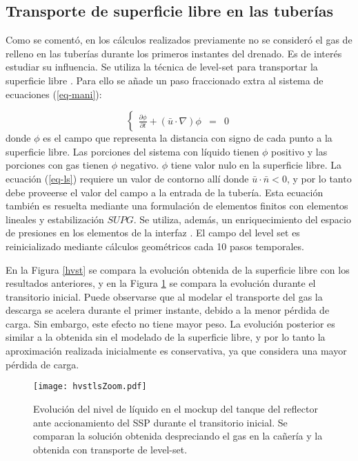 \subsection*{Transporte de superficie libre en las tuberías}

Como se comentó, en los cálculos realizados previamente no se consideró el gas de relleno en las tuberías durante los primeros instantes del drenado.
Es de interés estudiar su influencia.
Se utiliza la técnica de level-set para transportar la superficie libre \cite{level-set}.
Para ello se añade un paso fraccionado extra al sistema de ecuaciones (\ref{eq-mani}):

\begin{equation}
\left\{ \begin{array}{rcl}
\displaystyle \frac{\partial\phi}{\partial t}+ (\bar{u} \cdot \nabla) \phi &=& 0
\label{eq-ls}
\end{array} \right.
\end{equation}
donde $\phi$ es el campo que representa la distancia con signo de cada punto a la superficie libre.
Las porciones del sistema con líquido tienen $\phi$ positivo y las porciones con gas tienen $\phi$ negativo.
$\phi$ tiene valor nulo en la superficie libre.
La ecuación (\ref{eq-ls}) requiere un valor de contorno allí donde $\bar{u} \cdot \bar{n} < 0$,
y por lo tanto debe proveerse el valor del campo a la entrada de la tubería.
Esta ecuación también es resuelta mediante una formulación de elementos finitos con elementos lineales y estabilización $SUPG$.
Se utiliza, además, un enriquecimiento del espacio de presiones en los elementos de la interfaz \cite{enriq}.
El campo del level set es reinicializado mediante cálculos geométricos cada 10 pasos temporales.

En la Figura \ref{hvst} se compara la evolución obtenida de la superficie libre con los resultados anteriores,
y en la Figura \ref{hvstls} se compara la evolución durante el transitorio inicial.
Puede observarse que al modelar el transporte del gas la descarga se acelera durante el primer instante, debido a la menor pérdida de carga.
Sin embargo, este efecto no tiene mayor peso.
La evolución posterior es similar a la obtenida sin el modelado de la superficie libre,
y por lo tanto la aproximación realizada inicialmente es conservativa, ya que considera una mayor pérdida de carga.

\begin{figure}['ht]
\centering
\texttt{[image: hvstlsZoom.pdf]}
\caption{Evolución del nivel de líquido en el mockup del tanque del reflector ante accionamiento del SSP durante el transitorio inicial.
  Se comparan la solución obtenida despreciando el gas en la cañería y la obtenida con transporte de level-set.}  
	\label{hvstls}
\end{figure}

